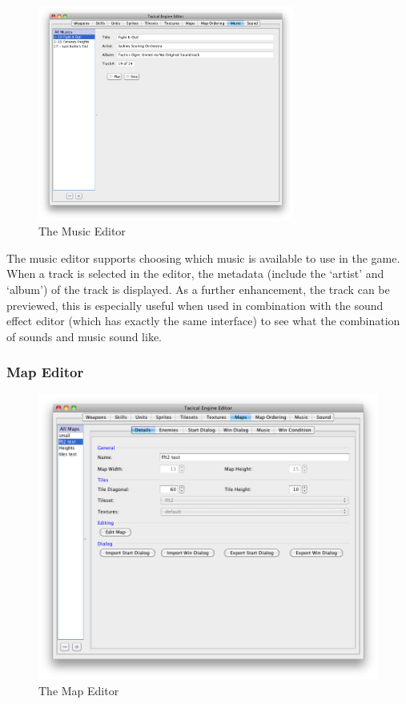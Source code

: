 \begin{figure}[htb]
	\centering
		\includegraphics[width=0.75\textwidth]{figures/editor/Music.png}
	\caption{The Music Editor}
	\label{fig:figures_editor_Music}
\end{figure}
The music editor supports choosing which music is available to use in the game.  When a track is selected in the editor, the metadata (include the `artist' and `album') of the track is displayed.  As a further enhancement, the track can be previewed, this is especially useful when used in combination with the sound effect editor (which has exactly the same interface) to see what the combination of sounds and music sound like. 

\clearpage

\subsubsection{Map Editor}

\begin{figure}[htbp]
	\centering
		\includegraphics[width=.9\textwidth]{figures/editor/maps.png}
	\caption{The Map Editor}
	\label{fig:figures_editor_maps}
\end{figure}

